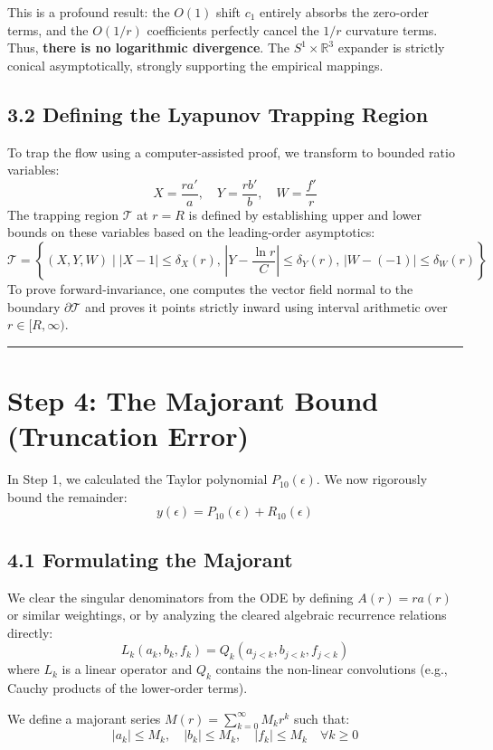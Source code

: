 \documentclass[12pt]{article}
\begin{document}
This is a profound result: the $O(1)$ shift $c_1$ entirely absorbs the zero-order terms, and the $O(1/r)$ coefficients perfectly cancel the $1/r$ curvature terms. Thus, \textbf{there is no logarithmic divergence}. The $S^1 \times \mathbb{R}^3$ expander is strictly conical asymptotically, strongly supporting the empirical mappings.

\subsection*{3.2 Defining the Lyapunov Trapping Region}
To trap the flow using a computer-assisted proof, we transform to bounded ratio variables:
\[ X = \frac{r a'}{a}, \quad Y = \frac{r b'}{b}, \quad W = \frac{f'}{r} \]
The trapping region $\mathcal{T}$ at $r=R$ is defined by establishing upper and lower bounds on these variables based on the leading-order asymptotics:
\[ \mathcal{T} = \left\{ (X, Y, W) \mid |X - 1| \leq \delta_X(r), \, \left|Y - \frac{\ln r}{C}\right| \leq \delta_Y(r), \, |W - (-1)| \leq \delta_W(r) \right\} \]
To prove forward-invariance, one computes the vector field normal to the boundary $\partial \mathcal{T}$ and proves it points strictly inward using interval arithmetic over $r \in [R, \infty)$.

\vspace{1em}
\hrule
\vspace{1em}

\section*{Step 4: The Majorant Bound (Truncation Error)}

In Step 1, we calculated the Taylor polynomial $P_{10}(\epsilon)$. We now rigorously bound the remainder:
\[ y(\epsilon) = P_{10}(\epsilon) + R_{10}(\epsilon) \]

\subsection*{4.1 Formulating the Majorant}
We clear the singular denominators from the ODE by defining $A(r) = r a(r)$ or similar weightings, or by analyzing the cleared algebraic recurrence relations directly:
\[ L_k(a_k, b_k, f_k) = Q_k(a_{j < k}, b_{j < k}, f_{j < k}) \]
where $L_k$ is a linear operator and $Q_k$ contains the non-linear convolutions (e.g., Cauchy products of the lower-order terms).

We define a majorant series $M(r) = \sum_{k=0}^\infty M_k r^k$ such that:
\[ |a_k| \leq M_k, \quad |b_k| \leq M_k, \quad |f_k| \leq M_k \quad \forall k \ge 0 \]
\end{document}
